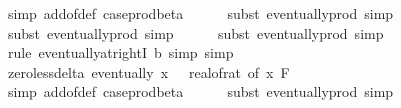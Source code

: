 \begin{isabellebody}
\ {\isacharparenleft}{\kern0pt}simp\ add{\isacharcolon}{\kern0pt}{\isasymepsilon}{\isacharunderscore}{\kern0pt}of{\isacharunderscore}{\kern0pt}def\ case{\isacharunderscore}{\kern0pt}prod{\isacharunderscore}{\kern0pt}beta{\isacharprime}{\kern0pt}{\isacharparenright}{\kern0pt}\isanewline
\ \ \ \ \isamarkupfalse%
\ {\isacharparenleft}{\kern0pt}subst\ eventually{\isacharunderscore}{\kern0pt}prod{}{\isacharprime}{\kern0pt}{\isacharcomma}{\kern0pt}\ simp{\isacharparenright}{\kern0pt}\isanewline
\ \ \ \ \isamarkupfalse%
\ {\isacharparenleft}{\kern0pt}subst\ eventually{\isacharunderscore}{\kern0pt}prod{}{\isacharprime}{\kern0pt}{\isacharcomma}{\kern0pt}\ simp{\isacharparenright}{\kern0pt}\isanewline
\ \ \ \ \isamarkupfalse%
\ {\isacharparenleft}{\kern0pt}subst\ eventually{\isacharunderscore}{\kern0pt}prod{}{\isacharprime}{\kern0pt}{\isacharcomma}{\kern0pt}\ simp{\isacharparenright}{\kern0pt}\isanewline
\ \ \ \ \isamarkupfalse%
\ {\isacharparenleft}{\kern0pt}rule\ eventually{\isacharunderscore}{\kern0pt}at{\isacharunderscore}{\kern0pt}rightI{\isacharbrackleft}{\kern0pt}\ b{\isacharequal}{\kern0pt}{\isachardoublequoteopen}{}{\isachardoublequoteclose}{\isacharbrackright}{\kern0pt}{\isacharcomma}{\kern0pt}\ simp{\isacharcomma}{\kern0pt}\ simp{\isacharparenright}{\kern0pt}\isanewline
\isanewline
\ \ \isamarkupfalse%
\ zero{\isacharunderscore}{\kern0pt}less{\isacharunderscore}{\kern0pt}delta{\isacharcolon}{\kern0pt}\ {\isachardoublequoteopen}eventually\ {\isacharparenleft}{\kern0pt}{\isasymlambda}x{\isachardot}{\kern0pt}\ {}\ {\isacharless}{\kern0pt}\ {\isacharparenleft}{\kern0pt}real{\isacharunderscore}{\kern0pt}of{\isacharunderscore}{\kern0pt}rat\ {\isacharparenleft}{\kern0pt}{\isasymdelta}{\isacharunderscore}{\kern0pt}of\ x{\isacharparenright}{\kern0pt}{\isacharparenright}{\kern0pt}{\isacharparenright}{\kern0pt}\ {\isacharquery}{\kern0pt}F{\isachardoublequoteclose}\isanewline
\ \ \ \ \isamarkupfalse%
\ {\isacharparenleft}{\kern0pt}simp\ add{\isacharcolon}{\kern0pt}{\isasymdelta}{\isacharunderscore}{\kern0pt}of{\isacharunderscore}{\kern0pt}def\ case{\isacharunderscore}{\kern0pt}prod{\isacharunderscore}{\kern0pt}beta{\isacharprime}{\kern0pt}{\isacharparenright}{\kern0pt}\isanewline
\ \ \ \ \isamarkupfalse%
\ {\isacharparenleft}{\kern0pt}subst\ eventually{\isacharunderscore}{\kern0pt}prod{}{\isacharprime}{\kern0pt}{\isacharcomma}{\kern0pt}\ simp{\isacharparenright}{\kern0pt}\isanewline

\end{isabellebody}
